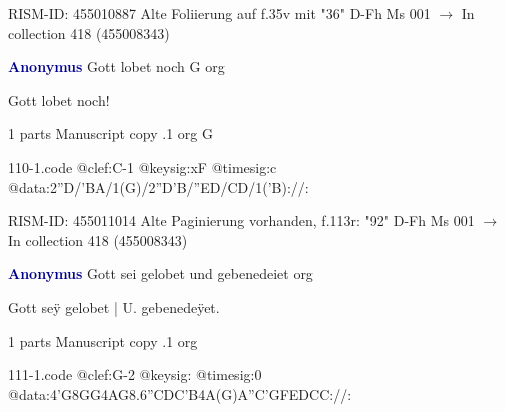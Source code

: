 \documentclass[twocolumn]{book}
\begin{document}
\newline RISM-ID: 455010887
\newline Alte Foliierung auf f.35v mit "36"
\newline D-Fh  Ms 001
\newline $\rightarrow$ In collection 418 (455008343)

\newline \par \vspace{7pt} \textcolor{darkblue}{\textbf{Anonymus  }}
\newline Gott lobet noch  G  
\newline org
\newline \begin{itshape}[f.113r, heading:] Gott lobet noch!\end{itshape} 
\newline \textcolor{darkblue}{}  1 parts  
\newline Manuscript copy
.1  org  G  
\begin{filecontents*}{110-1.code}
@clef:C-1
@keysig:xF
@timesig:c
@data:2''D/'BA/1(G)/2''D'B/''ED/CD/1('B)://:
\end{filecontents*}
\newline
%

\newline RISM-ID: 455011014
\newline Alte Paginierung vorhanden, f.113r: "92"
\newline D-Fh  Ms 001
\newline $\rightarrow$ In collection 418 (455008343)

\newline \par \vspace{7pt} \textcolor{darkblue}{\textbf{Anonymus  }}
\newline Gott sei gelobet und gebenedeiet    
\newline org
\newline \begin{itshape}[f.34v, at left:] Gott seÿ gelobet | U. gebenedeÿet.\end{itshape} 
\newline \textcolor{darkblue}{}  1 parts  
\newline Manuscript copy
.1  org  
\begin{filecontents*}{111-1.code}
@clef:G-2
@keysig:
@timesig:0
@data:4'G{8GG}4AG{8.6''CDC'B}4A(G)A''C'GFEDCC://:
\end{filecontents*}
\newline
%
\end{document}
